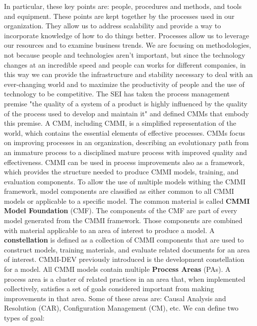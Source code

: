In particular, these key points are: people, procedures and methods, and tools and equipment.
These points are kept together by the processes used in our organization.
They allow us to address scalability and provide a way to incorporate knowledge of how to do things better.
Processes allow us to leverage our resources and to examine business trends.
We are focusing on methodologies, not because people and technologies aren't important, but since the technology changes at an incredible speed and people can works for different companies, in this way we can provide the infrastructure and stability necessary to deal with an ever-changing world and to maximize the productivity of people and the use of technology to be competitive.
The SEI has taken the process management premise "the quality of a system of a product is highly influenced by the quality of the process used to develop and maintain it" and defined CMMs that embody this premise.
A CMM, including CMMI, is a simplified representation of the world, which contains the essential elements of effective processes.
CMMs focus on improving processes in an organization, describing an evolutionary path from an immature process to a disciplined mature process with improved quality and effectiveness.
CMMI can be used in process improvements also as a framework, which provides the structure needed to produce CMMI models, training, and evaluation components.
To allow the use of multiple models withing the CMMI framework, model components are classified as either common to all CMMI models or applicable to a specific model.
The common material is called \textbf{CMMI Model Foundation} (CMF).
The components of the CMF are part of every model generated from the CMMI framework.
Those components are combined with material applicable to an area of interest to produce a model.
A \textbf{constellation} is defined as a collection of CMMI components that are used to construct models, training materials, and evaluate related documents for an area of interest. CMMI-DEV previously introduced is the development constellation for a model.
All CMMI models contain multiple \textbf{Process Areas} (PAs).
A process area is a cluster of related practices in an area that, when implemented collectively, satisfies a set of goals considered important from making improvements in that area.
Some of these areas are: Causal Analysis and Resolution (CAR), Configuration Management (CM), etc.
We can define two types of goal:
